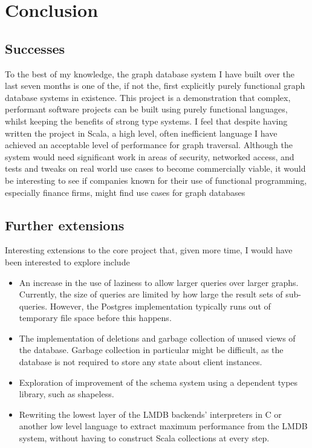 \documentclass[12pt,a4paper,twoside,openright]{report}
\begin{document}
	
\chapter{Conclusion}

\section{Successes}
To the best of my knowledge, the graph database system I have built over the last seven months is one of the, if not the, first explicitly purely functional graph database systems in existence. This project is a demonstration that complex, performant software projects can be built using purely functional languages, whilst keeping the benefits of strong type systems. I feel that despite having written the project in Scala, a high level, often inefficient language I have achieved an acceptable level of performance for graph traversal. Although the system would need significant work in areas of security, networked access, and tests and tweaks on real world use cases to become commercially viable, it would be interesting to see if companies known for their use of functional programming, especially finance firms, might find use cases for graph databases

\section{Further extensions}
Interesting extensions to the core project that, given more time, I would have been interested to explore include
\begin{itemize}
 \item An increase in the use of laziness to allow larger queries over larger graphs. Currently, the size of queries are limited by how large the result sets of sub-queries. However, the Postgres implementation typically runs out of temporary file space before this happens.
 \item The implementation of deletions and garbage collection of unused views of the database. Garbage collection in particular might be difficult, as the database is not required to store any state about client instances.
 \item Exploration of  improvement of the schema system using a dependent types library, such as shapeless.
 \item Rewriting the lowest layer of the LMDB backends' interpreters in C or another low level language to extract maximum performance from the LMDB system, without having to construct Scala collections at every step.
\end{itemize}
\end{document}
